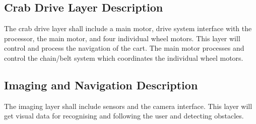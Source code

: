 \subsection{Crab Drive Layer Description}
The crab drive layer shall include a main motor, drive system interface with the processor, the main motor, and four individual wheel motors. This layer will control and process the navigation of the cart. The main motor processes and control the chain/belt system which coordinates the individual wheel motors.

\subsection{Imaging and Navigation Description}
The imaging layer shall include sensors and the camera interface. This layer will get visual data for recognising and following the user and detecting obstacles.
